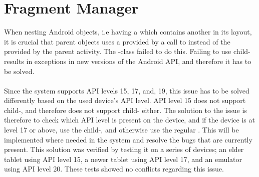 \section{Fragment Manager}
\label{sec:fragment_manager}

When nesting Android  objects, i.e having a  which contains another  in its layout, it is crucial that parent  objects uses a  provided by a call to  instead of the  provided by the parent activity. The \giraf-class\linebreak{} failed to do this. Failing to use child- results in exceptions in new versions of the Android API, and therefore it has to be solved. 
\\\\
Since the \giraf system supports API levels 15, 17, and, 19, this issue has to be solved differently based on the used device's API level. API level 15 does not support child-, and therefore does not support child- either. The solution to the issue is therefore to check which API level is present on the device, and if the device is at level 17 or above, use the child-, and otherwise use the regular . This will be implemented where needed in the \giraf system and resolve the bugs that are currently present. This solution was verified by testing it on a series of devices; an elder tablet using API level 15, a newer tablet using API level 17, and an emulator using API level 20. These tests showed no conflicts regarding this issue.